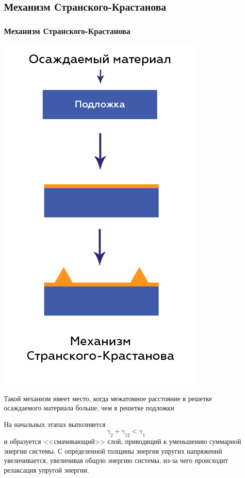 \documentclass[10pt,pdf,hyperref={unicode}, dvipsnames]{beamer}
\begin{document}
\subsection{Механизм Странского-Крастанова}
\begin{frame}[t]
	\frametitle{Механизм Странского-Крастанова}
	\begin{minipage}{0.4\linewidth}
		\includegraphics[width = \linewidth]{imgs/SKM.png}
	\end{minipage}	
	\begin{minipage}{0.59\linewidth}
		Такой механизм имеет место, когда межатомное расстояние в решетке осаждаемого материала больше, чем в решетке подложки

		На начальных этапах выполняется $$ \gamma_2+\gamma_{12}<\gamma_1 $$ и образуется <<смачивающий>>   слой, приводящий к уменьшению суммарной энергии системы. С определенной
		толщины энергия упругих напряжений увеличивается, увеличивая общую энергию системы, из-за чего происходит релаксация упругой энергии.
	\end{minipage}
\end{frame}
\end{document}
